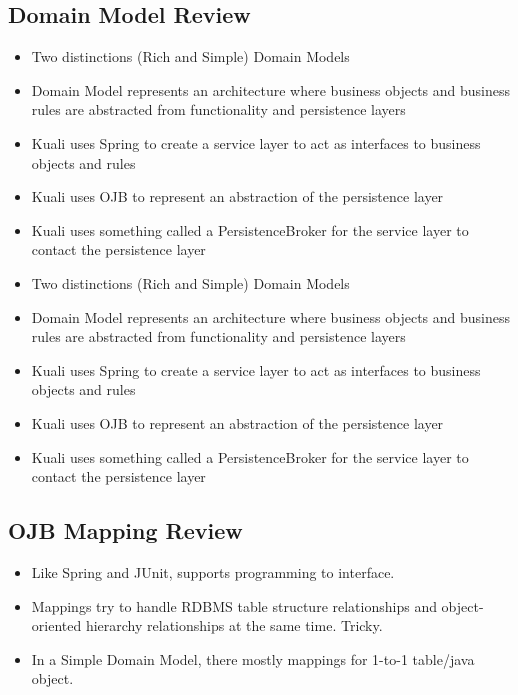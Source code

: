 \begin{ifhtml}
\begin{s5slide}
      \section{Domain Model Review}
      \begin{itemize}
        \item Two distinctions (Rich and Simple) Domain Models
        \item Domain Model represents an architecture where business objects and business rules are 
          abstracted from functionality and persistence layers
        \item Kuali uses Spring to create a service layer to act as interfaces to business objects and
          rules
        \item Kuali uses OJB to represent an abstraction of the persistence layer
        \item Kuali uses something called a PersistenceBroker for the service layer to
          contact the persistence layer
      \end{itemize}
      \begin{s5notes}
        \begin{itemize}
        \item Two distinctions (Rich and Simple) Domain Models
        \item Domain Model represents an architecture where business objects and business rules are 
          abstracted from functionality and persistence layers
        \item Kuali uses Spring to create a service layer to act as interfaces to business objects and
          rules
        \item Kuali uses OJB to represent an abstraction of the persistence layer
        \item Kuali uses something called a PersistenceBroker for the service layer to
          contact the persistence layer
        \end{itemize}
      \end{s5notes}
    \end{s5slide}

    \begin{s5slide}
      \section {OJB Mapping Review}
      \begin{itemize}
        \item Like Spring and JUnit, supports programming to interface.
        \item Mappings try to handle RDBMS table structure relationships and object-oriented hierarchy relationships
           at the same time. Tricky.
         \item In a Simple Domain Model, there mostly mappings for 1-to-1 table/java object.
      \end{itemize}
      

\end{s5slide}
\end{ifhtml}
